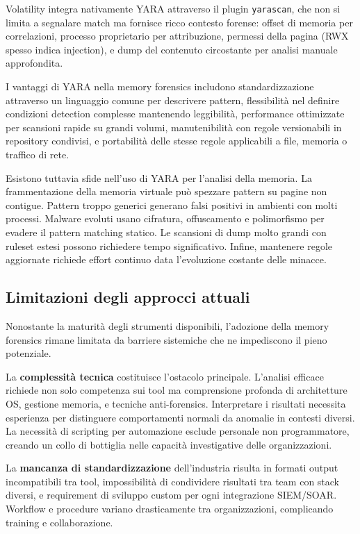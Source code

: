 Volatility integra nativamente YARA attraverso il plugin \texttt{yarascan}, che non si limita a segnalare match ma fornisce ricco contesto forense: offset di memoria per correlazioni, processo proprietario per attribuzione, permessi della pagina (RWX spesso indica injection), e dump del contenuto circostante per analisi manuale approfondita.

I vantaggi di YARA nella memory forensics includono standardizzazione attraverso un linguaggio comune per descrivere pattern, flessibilità nel definire condizioni detection complesse mantenendo leggibilità, performance ottimizzate per scansioni rapide su grandi volumi, manutenibilità con regole versionabili in repository condivisi, e portabilità delle stesse regole applicabili a file, memoria o traffico di rete.

Esistono tuttavia sfide nell'uso di YARA per l'analisi della memoria. La frammentazione della memoria virtuale può spezzare pattern su pagine non contigue. Pattern troppo generici generano falsi positivi in ambienti con molti processi. Malware evoluti usano cifratura, offuscamento e polimorfismo per evadere il pattern matching statico. Le scansioni di dump molto grandi con ruleset estesi possono richiedere tempo significativo. Infine, mantenere regole aggiornate richiede effort continuo data l'evoluzione costante delle minacce.

\subsection{Limitazioni degli approcci attuali}

Nonostante la maturità degli strumenti disponibili, l'adozione della memory forensics rimane limitata da barriere sistemiche che ne impediscono il pieno potenziale.

La \textbf{complessità tecnica} costituisce l'ostacolo principale. L'analisi efficace richiede non solo competenza sui tool ma comprensione profonda di architetture OS, gestione memoria, e tecniche anti-forensics. Interpretare i risultati necessita esperienza per distinguere comportamenti normali da anomalie in contesti diversi. La necessità di scripting per automazione esclude personale non programmatore, creando un collo di bottiglia nelle capacità investigative delle organizzazioni.

La \textbf{mancanza di standardizzazione} dell'industria risulta in formati output incompatibili tra tool, impossibilità di condividere risultati tra team con stack diversi, e requirement di sviluppo custom per ogni integrazione SIEM/SOAR. Workflow e procedure variano drasticamente tra organizzazioni, complicando training e collaborazione.

